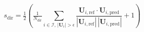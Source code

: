 \documentclass[11pt]{article}
\begin{document}
\begin{equation*}
s_{\text{dir}} = \tfrac{1}{2}\!\left(\tfrac{1}{N_{\text{dir}}}\! \sum_{i \in \mathcal{I},\, |\mathbf{U}_i| > \epsilon}\! \frac{\mathbf{U}_{i,\text{ref}} \cdot \mathbf{U}_{i,\text{pred}}}{|\mathbf{U}_{i,\text{ref}}|\,|\mathbf{U}_{i,\text{pred}}|} + 1\right)\tag{10}
\end{equation*}
\end{document}
